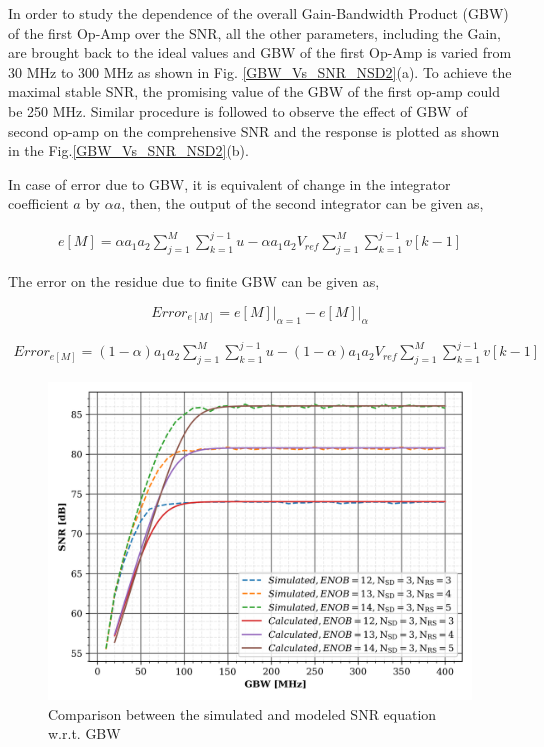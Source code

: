 In order to study the dependence of the overall Gain-Bandwidth Product (GBW) of the first Op-Amp over the SNR, all the other parameters, including the Gain, are brought back to the ideal values and GBW of the first Op-Amp is varied from 30 MHz to 300 MHz as shown in Fig. \ref{GBW_Vs_SNR_NSD2}(a). To achieve the maximal stable SNR, the promising value of the GBW of the first op-amp could be 250 MHz. Similar procedure is followed to observe the effect of GBW of second op-amp on the comprehensive SNR and the response is plotted as shown in the Fig.\ref{GBW_Vs_SNR_NSD2}(b).

In case of error due to GBW, it is equivalent of change in the integrator coefficient $a$ by $\alpha a$, then, the output of the second integrator can be given as,

 
 \begin{equation*}
     \begin{split}
         e[M] = \alpha a_1a_2\sum_{j=1}^{M}\sum_{k=1}^{j-1}u-\alpha a_1a_2V_{ref}\sum_{j=1}^{M}\sum_{k=1}^{j-1}v[k-1]
     \end{split}
 \end{equation*}
 
The error on the residue due to finite GBW can be given as, 

\begin{equation*}
    Error_{e[M]} = \left.e[M]\right|_{\alpha=1} - \left.e[M]\right|_{\alpha}
\end{equation*}

 
 \begin{equation*}
     \begin{split}
         Error_{e[M]} = \left(1-\alpha\right) a_1a_2\sum_{j=1}^{M}\sum_{k=1}^{j-1}u-\left(1-\alpha\right) a_1a_2V_{ref}\sum_{j=1}^{M}\sum_{k=1}^{j-1}v[k-1]
     \end{split}
 \end{equation*}

\begin{figure}[ht]
    \centering
    \includegraphics[scale=.7]{Chap04/Figures/snr_vs_gbw_sim_calc}
    \caption{Comparison between the simulated and modeled SNR equation w.r.t. GBW}
    \label{fig:SNR_GBW_calc}
\end{figure}


